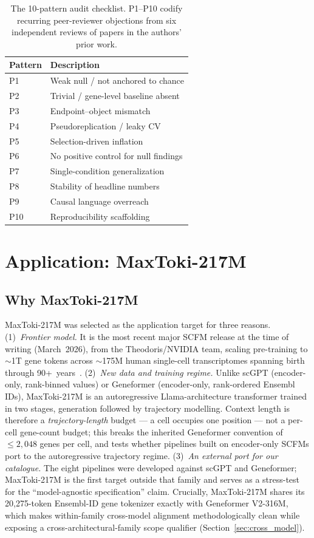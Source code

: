 \documentclass{article}
\newcommand{\maxtoki}{MaxToki-217M\xspace}
\newcommand{\geneformer}{Geneformer V2-316M\xspace}
\newcommand{\scfm}{SCFM\xspace}
\begin{document}
\begin{table}[t]
\centering
\small
\caption{The 10-pattern audit checklist. P1--P10 codify recurring
peer-reviewer objections from six independent reviews of papers in
the authors' prior work.}
\label{tab:audit}
\begin{tabular}{ll}
\toprule
\textbf{Pattern} & \textbf{Description} \\
\midrule
P1 & Weak null / not anchored to chance \\
P2 & Trivial / gene-level baseline absent \\
P3 & Endpoint--object mismatch \\
P4 & Pseudoreplication / leaky CV \\
P5 & Selection-driven inflation \\
P6 & No positive control for null findings \\
P7 & Single-condition generalization \\
P8 & Stability of headline numbers \\
P9 & Causal language overreach \\
P10 & Reproducibility scaffolding \\
\bottomrule
\end{tabular}
\end{table}

\section{Application: \maxtoki{}}

\subsection{Why \maxtoki{}}

\maxtoki{} was selected as the application target for three
reasons. (1)~\emph{Frontier model.} It is the most recent major
\scfm{} release at the time of writing (March~2026), from the
Theodoris/NVIDIA team, scaling pre-training to $\sim$1T gene tokens
across $\sim$175M human single-cell transcriptomes spanning birth
through 90+~years~\citep{maxtoki2026}. (2)~\emph{New data and
training regime.} Unlike scGPT (encoder-only, rank-binned values)
or Geneformer (encoder-only, rank-ordered Ensembl IDs), \maxtoki{}
is an autoregressive Llama-architecture transformer trained in
two stages, generation followed by trajectory modelling. Context
length is therefore a \emph{trajectory-length} budget --- a cell
occupies one position --- not a per-cell gene-count budget; this
breaks the inherited Geneformer convention of $\le 2{,}048$ genes
per cell, and tests whether pipelines built on encoder-only
\scfm{}s port to the autoregressive trajectory regime. (3)~\emph{An
external port for our catalogue.} The eight pipelines were
developed against scGPT and Geneformer; \maxtoki{} is the first
target outside that family and serves as a stress-test for the
``model-agnostic specification'' claim. Crucially, \maxtoki{}
shares its 20{,}275-token Ensembl-ID gene tokenizer exactly with
\geneformer{}, which makes within-family cross-model alignment
methodologically clean while exposing a cross-architectural-family
scope qualifier (Section~\ref{sec:cross_model}).
\end{document}
